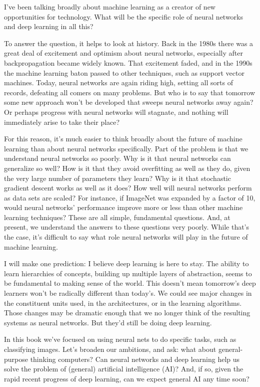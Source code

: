  I've been talking broadly about machine learning as a creator of new opportunities for technology. What will be the specific role of neural networks and deep learning in all this?

To answer the question, it helps to look at history. Back in the 1980s there was a great deal of excitement and optimism about neural networks, especially after backpropagation became widely known. That excitement faded, and in the 1990s the machine learning baton passed to other techniques, such as support vector machines. Today, neural networks are again riding high, setting all sorts of records, defeating all comers on many problems. But who is to say that tomorrow some new approach won't be developed that sweeps neural networks away again? Or perhaps progress with neural networks will stagnate, and nothing will immediately arise to take their place?

For this reason, it's much easier to think broadly about the future of machine learning than about neural networks specifically. Part of the problem is that we understand neural networks so poorly. Why is it that neural networks can generalize so well? How is it that they avoid overfitting as well as they do, given the very large number of parameters they learn? Why is it that stochastic gradient descent works as well as it does? How well will neural networks perform as data sets are scaled? For instance, if ImageNet was expanded by a factor of 10, would neural networks' performance improve more or less than other machine learning techniques? These are all simple, fundamental questions. And, at present, we understand the answers to these questions very poorly. While that's the case, it's difficult to say what role neural networks will play in the future of machine learning.

I will make one prediction: I believe deep learning is here to stay. The ability to learn hierarchies of concepts, building up multiple layers of abstraction, seems to be fundamental to making sense of the world. This doesn't mean tomorrow's deep learners won't be radically different than today's. We could see major changes in the constituent units used, in the architectures, or in the learning algorithms. Those changes may be dramatic enough that we no longer think of the resulting systems as neural networks. But they'd still be doing deep learning.

 In this book we've focused on using neural nets to do specific tasks, such as classifying images. Let's broaden our ambitions, and ask: what about general-purpose thinking computers? Can neural networks and deep learning help us solve the problem of (general) artificial intelligence (AI)? And, if so, given the rapid recent progress of deep learning, can we expect general AI any time soon?

